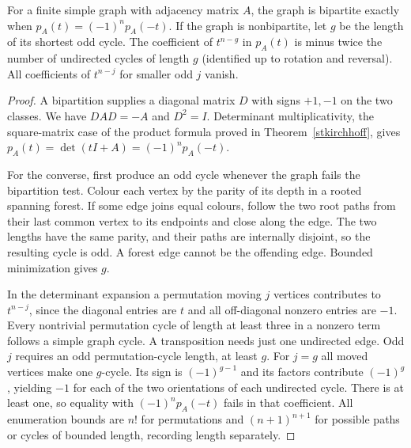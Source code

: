 \begin{theorem}\leavevmode\label{spec:bip}
For a finite simple graph with adjacency matrix $A$, the graph is bipartite exactly when $p_A(t)=(-1)^n p_A(-t)$. If the graph is nonbipartite, let $g$ be the length of its shortest odd cycle. The coefficient of $t^{n-g}$ in $p_A(t)$ is minus twice the number of undirected cycles of length $g$ (identified up to rotation and reversal). All coefficients of $t^{n-j}$ for smaller odd $j$ vanish.
\end{theorem}
\begin{proof}
A bipartition supplies a diagonal matrix $D$ with signs $+1,-1$ on the two classes. We have $DAD=-A$ and $D^2=I$. Determinant multiplicativity, the square-matrix case of the product formula proved in Theorem~\ref{stkirchhoff}, gives $p_A(t)=\det(tI+A)=(-1)^n p_A(-t)$.

For the converse, first produce an odd cycle whenever the graph fails the bipartition test. Colour each vertex by the parity of its depth in a rooted spanning forest. If some edge joins equal colours, follow the two root paths from their last common vertex to its endpoints and close along the edge. The two lengths have the same parity, and their paths are internally disjoint, so the resulting cycle is odd. A forest edge cannot be the offending edge. Bounded minimization gives $g$.

In the determinant expansion a permutation moving $j$ vertices contributes to $t^{n-j}$, since the diagonal entries are $t$ and all off-diagonal nonzero entries are $-1$. Every nontrivial permutation cycle of length at least three in a nonzero term follows a simple graph cycle. A transposition needs just one undirected edge. Odd $j$ requires an odd permutation-cycle length, at least $g$. For $j=g$ all moved vertices make one $g$-cycle. Its sign is $(-1)^{g-1}$ and its factors contribute $(-1)^g$, yielding $-1$ for each of the two orientations of each undirected cycle. There is at least one, so equality with $(-1)^n p_A(-t)$ fails in that coefficient. All enumeration bounds are $n!$ for permutations and $(n+1)^{n+1}$ for possible paths or cycles of bounded length, recording length separately.
\end{proof}

